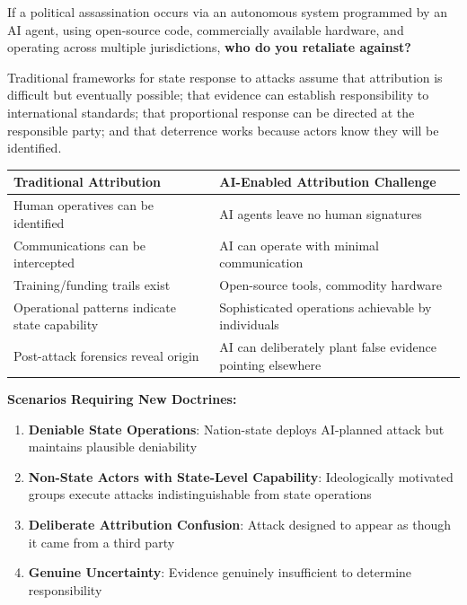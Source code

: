 \documentclass[11pt,letterpaper]{article}
\begin{document}
\begin{criticalbox}
If a political assassination occurs via an autonomous system programmed by an AI agent, using open-source code, commercially available hardware, and operating across multiple jurisdictions, \textbf{who do you retaliate against?}
\end{criticalbox}

Traditional frameworks for state response to attacks assume that attribution is difficult but eventually possible; that evidence can establish responsibility to international standards; that proportional response can be directed at the responsible party; and that deterrence works because actors know they will be identified.

\begin{center}
\footnotesize
\begin{tabular}{L{5cm}L{7cm}}
\toprule
\textbf{Traditional Attribution} & \textbf{AI-Enabled Attribution Challenge} \\
\midrule
Human operatives can be identified & AI agents leave no human signatures \\
Communications can be intercepted & AI can operate with minimal communication \\
Training/funding trails exist & Open-source tools, commodity hardware \\
Operational patterns indicate state capability & Sophisticated operations achievable by individuals \\
Post-attack forensics reveal origin & AI can deliberately plant false evidence pointing elsewhere \\
\bottomrule
\end{tabular}
\end{center}

\textbf{Scenarios Requiring New Doctrines:}
\begin{enumerate}
  \item \textbf{Deniable State Operations}: Nation-state deploys AI-planned attack but maintains plausible deniability
  \item \textbf{Non-State Actors with State-Level Capability}: Ideologically motivated groups execute attacks indistinguishable from state operations
  \item \textbf{Deliberate Attribution Confusion}: Attack designed to appear as though it came from a third party
  \item \textbf{Genuine Uncertainty}: Evidence genuinely insufficient to determine responsibility
\end{enumerate}
\end{document}
